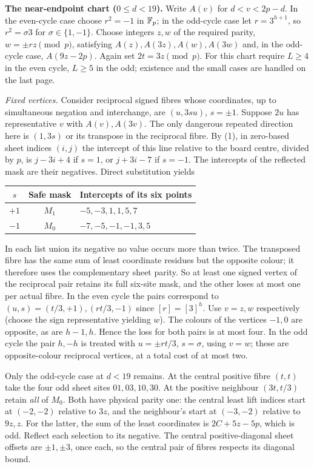 \documentclass[10pt]{article}
\begin{document}
\textbf{The near-endpoint chart ($0\le d<19$).} Write $A(v)$ for $d<v<2p-d$. In the even-cycle case choose $r^2=-1$ in $\mathbb F_p$; in the odd-cycle case let $r=3^{h+1}$, so $r^2=\sigma3$ for $\sigma\in\{1,-1\}$. Choose integers $z,w$ of the required parity, $w=\pm rz\pmod p$, satisfying $A(z),A(3z),A(w),A(3w)$ and, in the odd-cycle case, $A(9z-2p)$. Again set $2t=3z\pmod p$. For this chart require $L\ge4$ in the even cycle, $L\ge5$ in the odd; existence and the small cases are handled on the last page.

\textit{Fixed vertices.} Consider reciprocal signed fibres whose coordinates, up to simultaneous negation and interchange, are $(u,3s u)$, $s=\pm1$. Suppose $2u$ has representative $v$ with $A(v),A(3v)$. The only dangerous repeated direction here is $(1,3s)$ or its transpose in the reciprocal fibre. By (1), in zero-based sheet indices $(i,j)$ the intercept of this line relative to the board centre, divided by $p$, is $j-3i+4$ if $s=1$, or $j+3i-7$ if $s=-1$. The intercepts of the reflected mask are their negatives. Direct substitution yields
\begin{center}\begin{tabular}{ccl}\toprule$s$ & Safe mask & Intercepts of its six points\\\midrule
$+1$ & $M_1$ & $-5,-3,1,1,5,7$\\$-1$ & $M_0$ & $-7,-5,-1,-1,3,5$\\\bottomrule\end{tabular}\end{center}
In each list union its negative no value occurs more than twice. The transposed fibre has the same sum of least coordinate residues but the opposite colour; it therefore uses the complementary sheet parity. So at least one signed vertex of the reciprocal pair retains its full six-site mask, and the other loses at most one per actual fibre. In the even cycle the pairs correspond to $(u,s)=(t/3,+1),(rt/3,-1)$ since $[r]=[3]^h$. Use $v=z,w$ respectively (choose the sign representative yielding $w$). The colours of the vertices $-1,0$ are opposite, as are $h-1,h$. Hence the loss for both pairs is at most four. In the odd cycle the pair $h,-h$ is treated with $u=\pm rt/3$, $s=\sigma$, using $v=w$; these are opposite-colour reciprocal vertices, at a total cost of at most two.

\newpage{}
Only the odd-cycle case at $d<19$ remains. At the central positive fibre $(t,t)$ take the four odd sheet sites $01,03,10,30$. At the positive neighbour $(3t,t/3)$ retain \emph{all} of $M_0$. Both have physical parity one: the central least lift indices start at $(-2,-2)$ relative to $3z$, and the neighbour's start at $(-3,-2)$ relative to $9z,z$. For the latter, the sum of the least coordinates is $2C+5z-5p$, which is odd. Reflect each selection to its negative. The central positive-diagonal sheet offsets are $\pm1,\pm3$, once each, so the central pair of fibres respects its diagonal bound.
\end{document}
